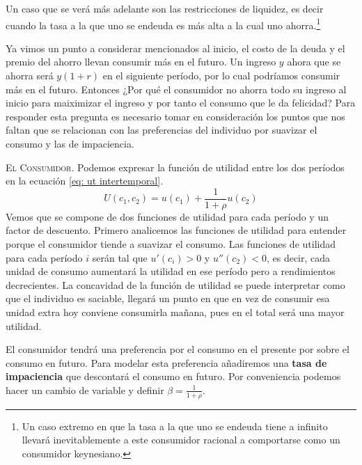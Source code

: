 
Un caso que se verá más adelante son las restricciones de liquidez, es decir cuando la tasa a la que uno se endeuda es más alta a la cual uno ahorra.\footnote{Un caso extremo en que la tasa a la que uno se endeuda tiene a infinito llevará inevitablemente a este consumidor racional a comportarse como un consumidor keynesiano.} 

Ya vimos un punto a considerar mencionados al inicio, el costo de la deuda y el premio del ahorro llevan consumir más en el futuro. Un ingreso $y$ ahora que se ahorra será $y(1+r)$ en el siguiente período, por lo cual podríamos consumir más en el futuro. Entonces ¿Por qué el consumidor no ahorra todo su ingreso al inicio para maiximizar el ingreso y por tanto el consumo que le da felicidad? Para responder esta pregunta es necesario tomar en consideración los puntos que nos faltan que se relacionan con las preferencias del individuo por suavizar el consumo y las de impaciencia. 

\textsc{El Consumidor}. Podemos expresar la función de utilidad entre los dos períodos en la ecuación \ref{eq: ut intertemporal}.
\begin{equation}
    U(c_1,c_2) = u(c_1) + \frac{1}{1+\rho} u(c_2) \label{eq: ut intertemporal}
\end{equation}
Vemos que se compone de dos funciones de utilidad para cada período y un factor de descuento. Primero analicemos las funciones de utilidad para entender porque el consumidor tiende a suavizar el consumo. Las funciones de utilidad para cada período $i$ serán tal que $u'(c_i)>0$ y $u''(c_2)<0$, es decir, cada unidad de consumo aumentará la utilidad en ese período pero a rendimientos decrecientes. La concavidad de la función de utilidad se puede interpretar como que el individuo es saciable, llegará un punto en que en vez de consumir esa unidad extra hoy conviene consumirla mañana, pues en el total será una mayor utilidad.

El consumidor tendrá una preferencia por el consumo en el presente por sobre el consumo en futuro. Para modelar esta preferencia añadiremos una \textbf{tasa de impaciencia} que descontará el consumo en futuro. 
Por conveniencia podemos hacer un cambio de variable y definir $\beta = \frac{1}{1+\rho}$. 

